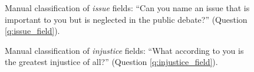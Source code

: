 \begin{figure}[h!]
    \caption[Manual classification of \textit{issue} fields]{Manual classification of \textit{issue} fields: ``Can you name an issue that is important to you but is neglected in the public debate?'' (Question \ref{q:issue_field}).
    }\label{fig:issue_field}
\end{figure}

\begin{figure}[h!]
    \caption[Manual classification of \textit{injustice} fields]{Manual classification of \textit{injustice} fields: ``What according to you is the greatest injustice of all?'' (Question \ref{q:injustice_field}).
    }\label{fig:injustice_field}
\end{figure}

